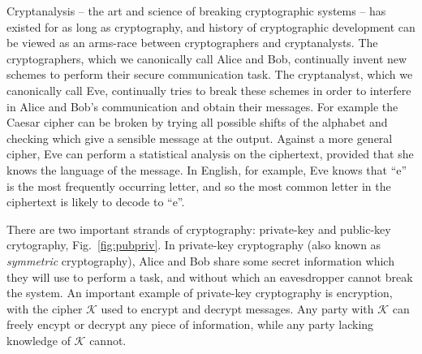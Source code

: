 Cryptanalysis -- the art and science of breaking cryptographic systems -- has existed for as long as cryptography, and history of cryptographic development can be viewed as an arms-race between cryptographers and cryptanalysts. The cryptographers, which we canonically call Alice and Bob, continually invent new schemes to perform their secure communication task. The cryptanalyst, which we canonically call Eve, continually tries to break these schemes in order to interfere in Alice and Bob's communication and obtain their messages. For example the Caesar cipher can be broken by trying all possible shifts of the alphabet and checking which give a sensible message at the output. Against a more general cipher, Eve can perform a statistical analysis on the ciphertext, provided that she knows the language of the message. In English, for example, Eve knows that ``e'' is the most frequently occurring letter, and so the most common letter in the ciphertext is likely to decode to ``e''.

There are two important strands of cryptography: private-key and public-key crytography, Fig.~\ref{fig:pubpriv}. In private-key cryptography (also known as \emph{symmetric} cryptography), Alice and Bob share some secret information which they will use to perform a task, and without which an eavesdropper cannot break the system. An important example of private-key cryptography is encryption, with the cipher $\mathcal{K}$ used to encrypt and decrypt messages. Any party with $\mathcal{K}$ can freely encypt or decrypt any piece of information, while any party lacking knowledge of $\mathcal{K}$ cannot. %



